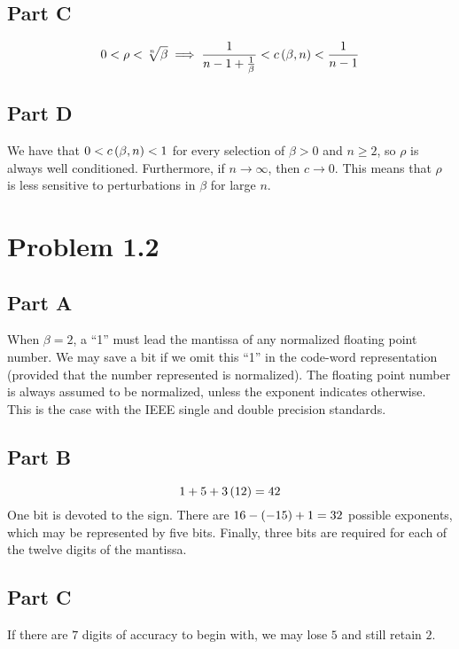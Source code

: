 \documentclass[12pt]{article}
\theoremstyle{definition}
\begin{document}
\subsection*{Part C}
$$
0 < \rho < \sqrt[n]{\beta} \implies \frac{1}{n-1 + \frac{1}{\beta}} < c\del{\beta,n} < \frac{1}{n-1}
$$

\subsection*{Part D}
We have that $0 < c\del{\beta,n} < 1$ for every selection of $\beta > 0$ and $n \geq 2$, so $\rho$ is always well conditioned. Furthermore, if $n \to \infty$, then $c \to 0$. This means that $\rho$ is less sensitive to perturbations in $\beta$ for large $n$.

\section*{Problem 1.2}
\subsection*{Part A}
When $\beta = 2$, a ``1'' must lead the mantissa of any normalized floating point number. We may save a bit if we omit this ``1'' in the code-word representation (provided that the number represented is normalized). The floating point number is always assumed to be normalized, unless the exponent indicates otherwise. This is the case with the IEEE single and double precision standards.

\subsection*{Part B}
$$
1 + 5 + 3\del{12} = 42
$$
One bit is devoted to the sign. There are $16-\del{-15} + 1 = 32$ possible exponents, which may be represented by five bits. Finally, three bits are required for each of the twelve digits of the mantissa.

\subsection*{Part C}
If there are $7$ digits of accuracy to begin with, we may lose $5$ and still retain $2$.
\end{document}
